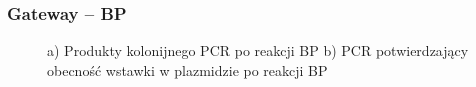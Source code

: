\documentclass{beamer}
\begin{document}
\begin{frame}
    \frametitle{Gateway -- BP}
    \begin{figure}[!htb]
        \centering
        \qquad
        \caption*\hfill{\scriptsize a) Produkty kolonijnego PCR po reakcji BP b) PCR potwierdzający obecność wstawki w plazmidzie po reakcji BP}%
        \label{fig:zele2}
    \end{figure}
\end{frame}
\end{document}
